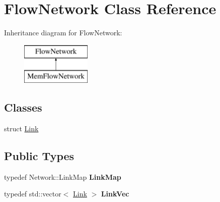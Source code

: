 \hypertarget{classFlowNetwork}{}\section{Flow\+Network Class Reference}
\label{classFlowNetwork}
Inheritance diagram for Flow\+Network\+:\begin{figure}[H]
\begin{center}
\leavevmode
\includegraphics[height=2.000000cm]{classFlowNetwork}
\end{center}
\end{figure}
\subsection*{Classes}
\begin{DoxyCompactItemize}
\item 
struct \mbox{\hyperlink{structFlowNetwork_1_1Link}{Link}}
\end{DoxyCompactItemize}
\subsection*{Public Types}
\begin{DoxyCompactItemize}
\item 
\mbox{\label{classFlowNetwork_a351e5fddabb58212785d018ee6668840}} 
typedef Network\+::\+Link\+Map {\bfseries Link\+Map}
\item 
\mbox{\label{classFlowNetwork_a5c77b7fd0cb165bd1d8ffefddbd61820}} 
typedef std\+::vector$<$ \mbox{\hyperlink{structFlowNetwork_1_1Link}{Link}} $>$ {\bfseries Link\+Vec}
\end{DoxyCompactItemize}
